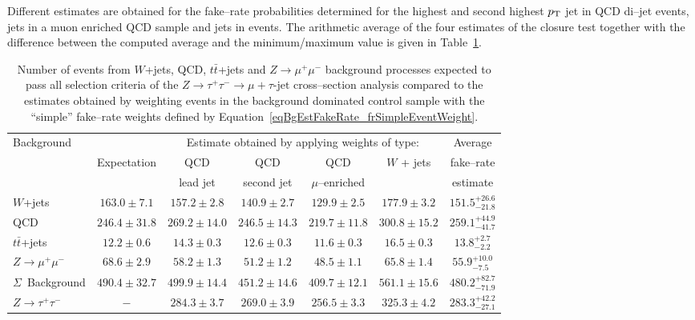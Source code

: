 Different estimates are obtained for the fake--rate probabilities determined for
the highest and second highest $p_{\mathrm{T}}$ jet in QCD di--jet events, jets in a muon
enriched QCD sample and jets in \WpJets events.  The arithmetic average of the
four estimates of the closure test together with the difference between the
computed average and the minimum/maximum value is given in
Table~\ref{tabBgEstFakeRate_frSimpleResults}.
%
\begin{table}[t]
\begin{center}
\begin{tabular}{|l|c|c|c|c|c|c|}
\hline
\multirow{2}{22mm}{Background}  &             & \multicolumn{4}{c|}{Estimate obtained by applying weights of type:} & Average \\
\multirow{2}{18mm}{Process}     & Expectation & QCD       & QCD        & QCD             & \multirow{2}{18mm}{$W$ + jets} & fake--rate \\
                                &             & lead jet & second jet & $\mu$--enriched &                                & estimate \\
\hline
\hline
$W$+jets                        & $163.0 \pm  7.1$ & $157.2 \pm  2.8$ & $140.9 \pm  2.7$ & $129.9 \pm  2.5$ & $177.9 \pm  3.2$ & $151.5^{+26.6}_{-21.8}$ \\
QCD                             & $246.4 \pm 31.8$ & $269.2 \pm 14.0$ & $246.5 \pm 14.3$ & $219.7 \pm 11.8$ & $300.8 \pm 15.2$ & $259.1^{+44.9}_{-41.7}$ \\
$t\bar{t}$+jets                 & $ 12.2 \pm  0.6$ & $ 14.3 \pm  0.3$ & $ 12.6 \pm  0.3$ & $ 11.6 \pm  0.3$ & $ 16.5 \pm  0.3$ & $ 13.8^{+2.7}_{-2.2}$ \\
$Z \rightarrow \mu^{+} \mu^{-}$ & $ 68.6 \pm  2.9$ & $ 58.2 \pm  1.3$ & $ 51.2 \pm  1.2$ & $ 48.5 \pm  1.1$ & $ 65.8 \pm  1.4$ & $ 55.9^{+10.0}_{-7.5}$ \\
\hline
$\Sigma$~Background             & $490.4 \pm 32.7$ & $499.9 \pm 14.4$ & $451.2 \pm 14.6$ & $409.7 \pm 12.1$ & $561.1 \pm 15.6$ & $480.2^{+82.7}_{-71.9}$ \\     
\hline
\hline
$Z \rightarrow \tau^{+} \tau^{-}$ & $-$ & $284.3 \pm 3.7$ & $269.0 \pm 3.9$ & $256.5 \pm 3.3$ & $325.3 \pm 4.2$ & $283.3^{+42.2}_{-27.1}$ \\
\hline
\end{tabular}
\end{center}
\begin{center}
\caption[Fake--rate ``simple'' method closure test results]{\captiontext Number
of events from $W$+jets, QCD, $t\bar{t}$+jets and $Z \rightarrow \mu^{+}
\mu^{-}$ background processes expected to pass all selection criteria of the $Z
\rightarrow \tau^{+} \tau^{-} \rightarrow \mu + \tau\mbox{-jet}$ cross--section
analysis compared to the estimates obtained by weighting events in the
background dominated control sample with the ``simple'' fake--rate weights
defined by Equation~\ref{eqBgEstFakeRate_frSimpleEventWeight}.}
\label{tabBgEstFakeRate_frSimpleResults}
\end{center}
\end{table}

